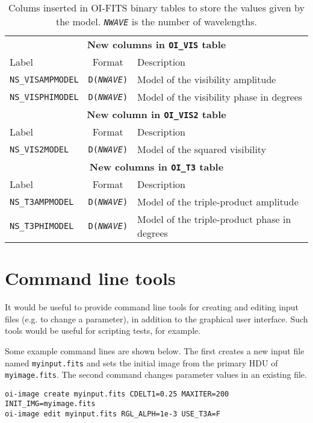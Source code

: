 \documentclass{article}
\newcommand*{\ROW}{} %
\newcommand*{\ROWTITLE}{} %
\begin{document}
\renewcommand{\ROW}[2]{\texttt{#1} & \texttt{D(\textsl{NWAVE})} & #2 \\}
\renewcommand{\ROWTITLE}[1]{\multicolumn{3}{c}{\textbf{#1}}\\}

\begin{table}
\caption{Colums inserted in OI-FITS binary tables to store the values given by
the model.  \texttt{\textsl{NWAVE}} is the number of wavelengths.
\label{tab:model-columns}}
\begin{tabular}{lcl}
\hline
\hline
\ROWTITLE{New columns in \texttt{OI\_VIS} table}
Label & Format & Description \\
\hline
\ROW{NS\_VISAMPMODEL}{Model of the visibility amplitude}
\ROW{NS\_VISPHIMODEL}{Model of the visibility phase in degrees}
\hline
\hline
\ROWTITLE{New column in \texttt{OI\_VIS2} table}
Label & Format & Description \\
\hline
\ROW{NS\_VIS2MODEL}{Model of the squared visibility}
\hline
\hline
\ROWTITLE{New columns in \texttt{OI\_T3} table}
Label & Format & Description \\
\hline
\ROW{NS\_T3AMPMODEL}{Model of the triple-product amplitude}
\ROW{NS\_T3PHIMODEL}{Model of the triple-product phase in degrees}
\hline
\end{tabular}
\end{table}

\section{Command line tools}

It would be useful to provide command line tools for creating and
editing input files (e.g. to change a parameter), in addition to the
graphical user interface. Such tools would be useful for scripting
tests, for example.

Some example command lines are shown below. The first creates a new input
file named \verb+myinput.fits+ and sets the initial image from the
primary HDU of \verb+myimage.fits+. The second command changes
parameter values in an existing file.

\begin{verbatim}
oi-image create myinput.fits CDELT1=0.25 MAXITER=200 INIT_IMG=myimage.fits
oi-image edit myinput.fits RGL_ALPH=1e-3 USE_T3A=F
\end{verbatim}

\appendix
\end{document}
